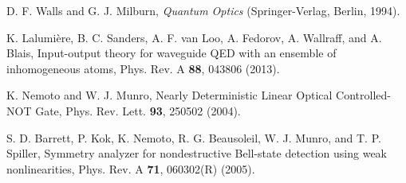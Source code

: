 \documentclass[showpacs,aps,graphicx,twocolumn]{revtex4}
\begin{document}
\begin{thebibliography}{1}
 D. F. Walls and G. J. Milburn,
\emph{Quantum Optics} (Springer-Verlag, Berlin, 1994).


 K. Lalumi\`{e}re, B. C. Sanders, A. F. van Loo, A. Fedorov,
A. Wallraff, and A. Blais, Input-output theory for waveguide QED with
an ensemble of inhomogeneous atoms, Phys. Rev. A \textbf{88}, 043806 (2013).


 K. Nemoto and W. J. Munro,
Nearly Deterministic Linear Optical Controlled-NOT Gate, Phys. Rev. Lett. \textbf{93}, 250502 (2004).


 S. D. Barrett, P. Kok, K. Nemoto, R. G. Beausoleil, W. J. Munro, and T. P. Spiller, Symmetry analyzer for nondestructive Bell-state detection using weak nonlinearities, Phys. Rev. A \textbf{71}, 060302(R) (2005).

\end{thebibliography}

\end{document}
